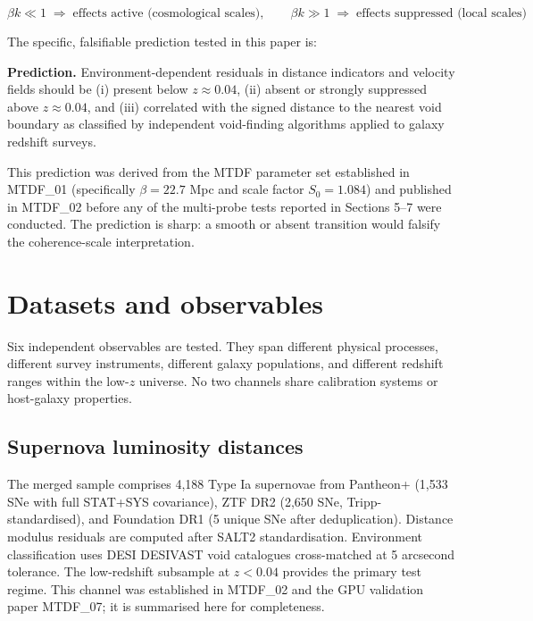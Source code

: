 \documentclass[11pt,a4paper]{article}
\begin{document}
\[
\beta k \ll 1 \;\Rightarrow\; \text{effects active (cosmological scales)}, \qquad
\beta k \gg 1 \;\Rightarrow\; \text{effects suppressed (local scales)}
\]

The specific, falsifiable prediction tested in this paper is:

\begin{mdframed}[linecolor=accent,linewidth=0.5pt,backgroundcolor=callout-bg,leftline=true,rightline=true,topline=true,bottomline=true,innerleftmargin=8pt,innerrightmargin=8pt,innertopmargin=6pt,innerbottommargin=6pt]
\textbf{Prediction.} Environment-dependent residuals in distance indicators and velocity fields should be (i) present below \(z \approx 0.04\), (ii) absent or strongly suppressed above \(z \approx 0.04\), and (iii) correlated with the signed distance to the nearest void boundary as classified by independent void-finding algorithms applied to galaxy redshift surveys.
\end{mdframed}

This prediction was derived from the MTDF parameter set established in MTDF\_\allowbreak{}01 (specifically \(\beta = 22.7\) Mpc and scale factor \(S_0 = 1.084\)) and published in MTDF\_\allowbreak{}02 before any of the multi-probe tests reported in Sections 5--7 were conducted. The prediction is sharp: a smooth or absent transition would falsify the coherence-scale interpretation.

\section{Datasets and observables}
\label{sec:sec3}
Six independent observables are tested. They span different physical processes, different survey instruments, different galaxy populations, and different redshift ranges within the low-\(z\) universe. No two channels share calibration systems or host-galaxy properties.

\subsection{Supernova luminosity distances}
The merged sample comprises 4,188 Type Ia supernovae from Pantheon+ (1,533 SNe with full STAT+SYS covariance), ZTF DR2 (2,650 SNe, Tripp-standardised), and Foundation DR1 (5 unique SNe after deduplication). Distance modulus residuals are computed after SALT2 standardisation. Environment classification uses DESI DESIVAST void catalogues cross-matched at 5 arcsecond tolerance. The low-redshift subsample at \(z < 0.04\) provides the primary test regime. This channel was established in MTDF\_\allowbreak{}02 and the GPU validation paper MTDF\_\allowbreak{}07; it is summarised here for completeness.
\end{document}
